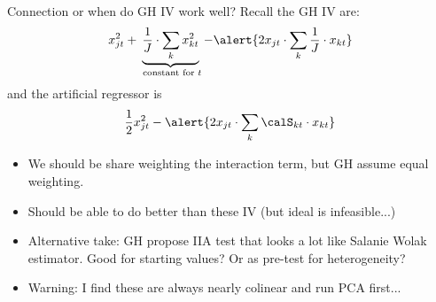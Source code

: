 \begin{frame}{Connection or when do GH IV work well?}
Recall the GH IV are:
\begin{align*}
x_{jt}^2 + \underbrace{\frac{1}{J} \cdot \sum_k x_{kt}^2}_{\text{ constant for } t } - \alert{2 x_{jt}  \cdot \sum_k  \frac{1}{J} \cdot x_{kt}}
\end{align*}
and the artificial regressor is
\begin{align*}
\frac{1}{2} x_{jt}^2 - \alert{2 x_{jt} \cdot \sum_k \calS_{kt}  \cdot x_{kt}}
\end{align*}
\begin{itemize}
\item We should be \alert{share weighting} the interaction term, but GH assume equal weighting.\\
\item Should be able to do better than these IV (but ideal is infeasible...)
\item Alternative take: GH propose IIA test that looks a lot like Salanie Wolak estimator. Good for starting values? Or as pre-test for heterogeneity?
\item Warning: I find these are always nearly colinear and run PCA first...
\end{itemize}
\end{frame}









